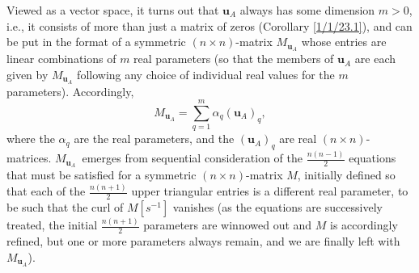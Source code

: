 \documentclass{amsart}
\numberwithin{equation}{section}
\theoremstyle{definition}
\numberwithin{theorem}{section}
\begin{document}
 Viewed as a vector space, it turns out that $\mathbf{u}_A$ always has some dimension $m>0$, i.e., it consists of more than just a matrix of zeros (Corollary \ref{1/1/23.1}), and can be put in the format of a symmetric $(n\times n)$-matrix $M_{\mathbf{u}_A}$ whose entries are linear combinations of $m$ real parameters (so that the members of $\mathbf{u}_A$ are each given by $M_{\mathbf{u}_A}$ following any choice of individual real values for the $m$ parameters).  Accordingly, \[ M_{\mathbf{u}_A} = \sum_{q=1}^m \alpha_q (\mathbf{u}_A)_q,\] where the $\alpha_q$ are the real parameters, and the $(\mathbf{u}_A)_q$ are real $(n\times n)$-matrices.  \mbox{$M_{\mathbf{u}_A}$ emerges} from sequential consideration of the $\frac{n(n-1)}{2}$ equations that must be satisfied for a symmetric $(n\times n)$-matrix $M$, initially defined so that each of the $\frac{n(n+1)}{2}$ upper triangular entries is a different real parameter, to be such that the curl of $M[s^{-1}]$ vanishes (as the equations are successively treated, the initial $\frac{n(n+1)}{2}$ parameters are winnowed out and $M$ is accordingly refined, but one or more parameters always remain, and we are finally left with $M_{\mathbf{u}_A}$).  
\end{document}
